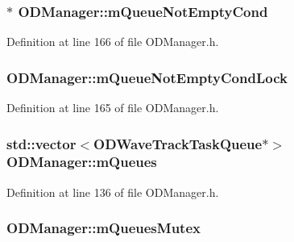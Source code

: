 \subsubsection[{\texorpdfstring{m\+Queue\+Not\+Empty\+Cond}{mQueueNotEmptyCond}}]{$\ast$ O\+D\+Manager\+::m\+Queue\+Not\+Empty\+Cond\hspace{0.3cm}{\ttfamily [protected]}}\hypertarget{class_o_d_manager_aba42a99deec038f307a29971320f8416}{}\label{class_o_d_manager_aba42a99deec038f307a29971320f8416}


Definition at line 166 of file O\+D\+Manager.\+h.

\subsubsection[{\texorpdfstring{m\+Queue\+Not\+Empty\+Cond\+Lock}{mQueueNotEmptyCondLock}}]{ O\+D\+Manager\+::m\+Queue\+Not\+Empty\+Cond\+Lock\hspace{0.3cm}{\ttfamily [protected]}}\hypertarget{class_o_d_manager_a85a3669d8bba22645b47ff06b4164ac4}{}\label{class_o_d_manager_a85a3669d8bba22645b47ff06b4164ac4}


Definition at line 165 of file O\+D\+Manager.\+h.

\subsubsection[{\texorpdfstring{m\+Queues}{mQueues}}]{\setlength{\rightskip}{0pt plus 5cm}std\+::vector$<${\bf O\+D\+Wave\+Track\+Task\+Queue}$\ast$$>$ O\+D\+Manager\+::m\+Queues\hspace{0.3cm}{\ttfamily [protected]}}\hypertarget{class_o_d_manager_ad6b9a0871a6624fa11b9deee2f23dd98}{}\label{class_o_d_manager_ad6b9a0871a6624fa11b9deee2f23dd98}


Definition at line 136 of file O\+D\+Manager.\+h.

\subsubsection[{\texorpdfstring{m\+Queues\+Mutex}{mQueuesMutex}}]{ O\+D\+Manager\+::m\+Queues\+Mutex\hspace{0.3cm}{\ttfamily [protected]}}\hypertarget{class_o_d_manager_a8bac5038bf5f5180de202e37e94258f4}{}\label{class_o_d_manager_a8bac5038bf5f5180de202e37e94258f4}


